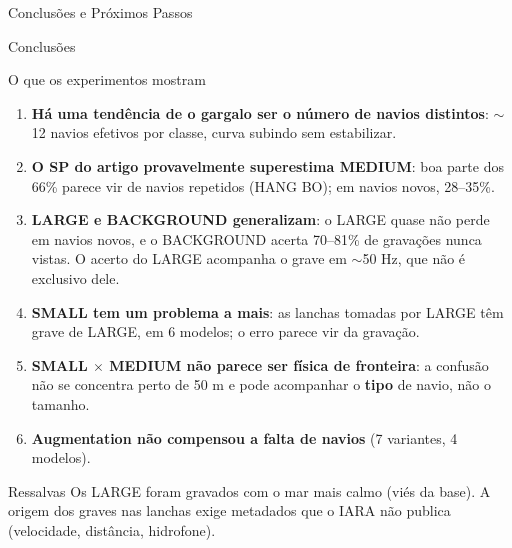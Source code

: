 \documentclass[aspectratio=169]{beamer}
\begin{document}
\begin{frame}
    \centering
    \huge Conclusões e Próximos Passos
\end{frame}

\begin{frame}{Conclusões}
    \footnotesize
    \begin{block}{\small O que os experimentos mostram}
        \scriptsize
        \begin{enumerate}
            \setlength{\itemsep}{2pt}
            \item \textbf{Há uma tendência de o gargalo ser o número de navios distintos}: $\sim$12 navios efetivos por classe, curva subindo sem estabilizar.
            \item \textbf{O SP do artigo provavelmente superestima MEDIUM}: boa parte dos 66\% parece vir de navios repetidos (HANG BO); em navios novos, 28--35\%.
            \item \textbf{LARGE e BACKGROUND generalizam}: o LARGE quase não perde em navios novos, e o BACKGROUND acerta 70--81\% de gravações nunca vistas. O acerto do LARGE acompanha o grave em $\sim$50 Hz, que não é exclusivo dele.
            \item \textbf{SMALL tem um problema a mais}: as lanchas tomadas por LARGE têm grave de LARGE, em 6 modelos; o erro parece vir da gravação.
            \item \textbf{SMALL $\times$ MEDIUM não parece ser física de fronteira}: a confusão não se concentra perto de 50 m e pode acompanhar o \textbf{tipo} de navio, não o tamanho.
            \item \textbf{Augmentation não compensou a falta de navios} (7 variantes, 4 modelos).
        \end{enumerate}
    \end{block}
    \begin{alertblock}{\small Ressalvas}
        \scriptsize
        Os LARGE foram gravados com o mar mais calmo (viés da base). A origem dos graves nas lanchas exige metadados que o IARA não publica (velocidade, distância, hidrofone).
    \end{alertblock}
\end{frame}
\end{document}
